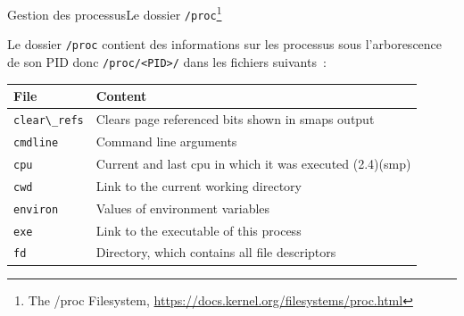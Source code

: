 \documentclass{beamer}
\begin{document}
    \begin{frame}{Gestion des processus}{Le dossier \lstinline{/proc}\footnote{The /proc Filesystem, \url{https://docs.kernel.org/filesystems/proc.html}}}
        \begin{footnotesize}
            Le dossier \lstinline{/proc} contient des informations sur les processus sous l'arborescence de son PID donc \lstinline{/proc/<PID>/} dans les fichiers suivants~:
            \begin{tiny}
                \begin{table}[h!]
                    \centering
                    \begin{tabular}{|p{2cm}|p{8cm}|}
                        \hline
                        \textbf{File}             & \textbf{Content}                                                                                                                \\
                        \hline
                        \lstinline{clear\_refs}   & Clears page referenced bits shown in smaps output                                                                               \\
                        \hline
                        \lstinline{cmdline}       & Command line arguments                                                                                                          \\
                        \hline
                        \lstinline{cpu}           & Current and last cpu in which it was executed (2.4)(smp)                                                                        \\
                        \hline
                        \lstinline{cwd}           & Link to the current working directory                                                                                           \\
                        \hline
                        \lstinline{environ}       & Values of environment variables                                                                                                 \\
                        \hline
                        \lstinline{exe}           & Link to the executable of this process                                                                                          \\
                        \hline
                        \lstinline{fd}            & Directory, which contains all file descriptors                                                                                  \\

\end{tabular}
\end{table}
\end{tiny}
\end{footnotesize}
\end{frame}
\end{document}
